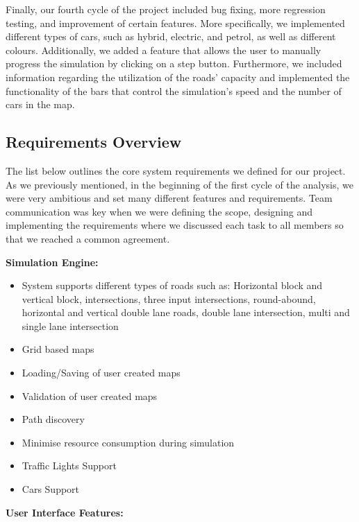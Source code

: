 \documentclass[oneside]{article}
\begin{document}
\noindent Finally, our fourth cycle of the project included bug fixing, more regression testing, and improvement of certain features. More specifically, we implemented different types of cars, such as hybrid, electric, and petrol, as well as different colours. Additionally, we added a feature that allows the user to manually progress the simulation by clicking on a step button. Furthermore, we included information regarding the utilization of the roads' capacity and implemented the functionality of the bars that control the simulation's speed and the number of cars in the map.

\subsection {{Requirements Overview}}

The list below outlines the core system requirements we defined for our project. As we previously mentioned, in the beginning of the first cycle of the analysis, we were very ambitious and set many different features and requirements. Team communication was key when we were defining the scope, designing and implementing the requirements where we discussed each task to all members so that we reached a common agreement.
\newline

\noindent \textbf{Simulation Engine:}
\begin{itemize}
  \item System supports different types of roads such as: Horizontal block and vertical block, intersections, three input intersections, round-abound, horizontal and vertical double lane roads, double lane intersection, multi and single lane intersection
  \item Grid based maps
  \item Loading/Saving of user created maps
  \item Validation of user created maps
  \item Path discovery
  \item Minimise resource consumption during simulation
  \item Traffic Lights Support
  \item Cars Support
 \end{itemize}
 
 \noindent \textbf  {User Interface Features:}
\end{document}
